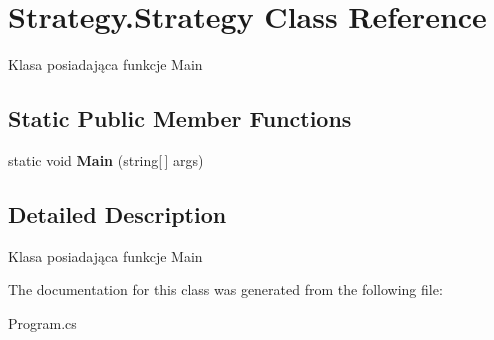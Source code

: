\hypertarget{class_strategy_1_1_strategy}{}\section{Strategy.\+Strategy Class Reference}
\label{class_strategy_1_1_strategy}


Klasa posiadająca funkcje Main  


\subsection*{Static Public Member Functions}
\begin{DoxyCompactItemize}
\item 
\mbox{\label{class_strategy_1_1_strategy_a2fc010052482408caae24ab2a267d3c5}} 
static void {\bfseries Main} (string\mbox{[}$\,$\mbox{]} args)
\end{DoxyCompactItemize}


\subsection{Detailed Description}
Klasa posiadająca funkcje Main 



The documentation for this class was generated from the following file\+:\begin{DoxyCompactItemize}
\item 
Program.\+cs\end{DoxyCompactItemize}
